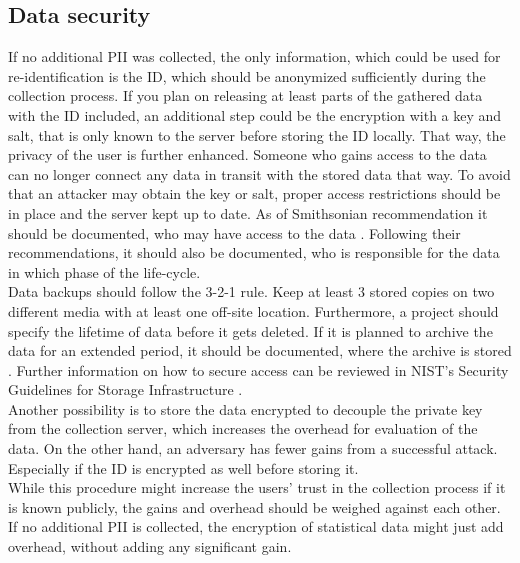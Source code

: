     \subsection{Data security}
        \label{subsec:data_storage}    
        If no additional PII was collected, the only information, which could be used for re-identification is the ID, which should be anonymized sufficiently during the collection process. If you plan on releasing at least parts of the gathered data with the ID included, an additional step could be the encryption with a key and salt, that is only known to the server before storing the ID locally. That way, the privacy of the user is further enhanced. Someone who gains access to the data can no longer connect any data in transit with the stored data that way.
        To avoid that an attacker may obtain the key or salt, proper access restrictions should be in place and the server kept up to date. As of Smithsonian recommendation it should be documented, who may have access to the data \cite{noauthor_best_2018}. Following their recommendations, it should also be documented, who is responsible for the data in which phase of the life-cycle.\\
        Data backups should follow the 3-2-1 rule. Keep at least 3 stored copies on two different media with at least one off-site location. Furthermore, a project should specify the lifetime of data before it gets deleted. If it is planned to archive the data for an extended period, it should be documented, where the archive is stored \cite{noauthor_best_2018}.
        Further information on how to secure access can be reviewed in NIST's Security Guidelines for Storage Infrastructure \cite{chandramouli_security_2020}. \\
        Another possibility is to store the data encrypted to decouple the private key from the collection server, which increases the overhead for evaluation of the data. On the other hand, an adversary has fewer gains from a successful attack. Especially if the ID is encrypted as well before storing it.\\
        While this procedure might increase the users' trust in the collection process if it is known publicly, the gains and overhead should be weighed against each other. If no additional PII is collected, the encryption of statistical data might just add overhead, without adding any significant gain.

